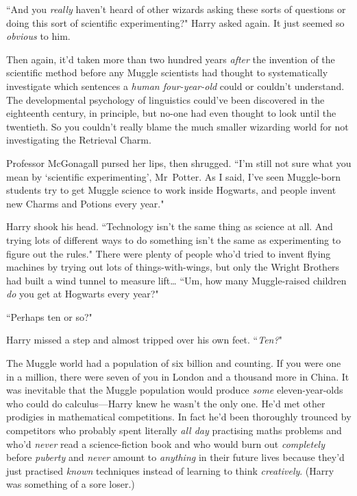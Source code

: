 ``And you \emph{really} haven't heard of other wizards asking these sorts of questions or doing this sort of scientific experimenting?" Harry asked again. It just seemed so \emph{obvious} to him.

Then again, it'd taken more than two hundred years \emph{after} the invention of the scientific method before any Muggle scientists had thought to systematically investigate which sentences a \emph{human four-year-old} could or couldn't understand. The developmental psychology of linguistics could've been discovered in the eighteenth century, in principle, but no-one had even thought to look until the twentieth. So you couldn't really blame the much smaller wizarding world for not investigating the Retrieval Charm.

Professor McGonagall pursed her lips, then shrugged. ``I'm still not sure what you mean by `scientific experimenting', Mr~Potter. As I said, I've seen Muggle-born students try to get Muggle science to work inside Hogwarts, and people invent new Charms and Potions every year."

Harry shook his head. ``Technology isn't the same thing as science at all. And trying lots of different ways to do something isn't the same as experimenting to figure out the rules." There were plenty of people who'd tried to invent flying machines by trying out lots of things-with-wings, but only the Wright Brothers had built a wind tunnel to measure lift{\ldots} ``Um, how many Muggle-raised children \emph{do} you get at Hogwarts every year?"

``Perhaps ten or so?"

Harry missed a step and almost tripped over his own feet. ``\emph{Ten?}"

The Muggle world had a population of six billion and counting. If you were one in a million, there were seven of you in London and a thousand more in China. It was inevitable that the Muggle population would produce \emph{some} eleven-year-olds who could do calculus—Harry knew he wasn't the only one. He'd met other prodigies in mathematical competitions. In fact he'd been thoroughly trounced by competitors who probably spent literally \emph{all day} practising maths problems and who'd \emph{never} read a science-fiction book and who would burn out \emph{completely} before \emph{puberty} and \emph{never} amount to \emph{anything} in their future lives because they'd just practised \emph{known} techniques instead of learning to think \emph{creatively}. (Harry was something of a sore loser.)

